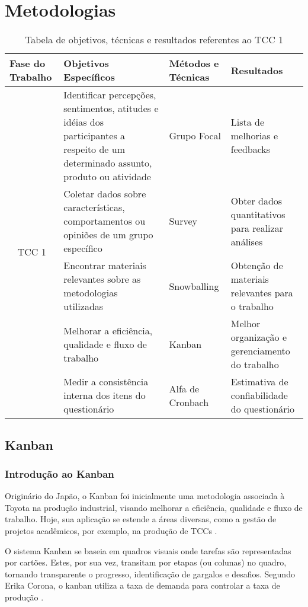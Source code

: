 \chapter[Metodologias]{Metodologias}

\begin{table}[!ht]
    \centering
    \begin{tabularx}{\textwidth}{|X|X|X|X|}
    \hline
        Fase do Trabalho & Objetivos Específicos & Métodos e Técnicas & Resultados \\ \hline
        \multicolumn{1}{c|}{\multirow{12}{*}{TCC 1}} & Identificar percepções, sentimentos, atitudes
        e idéias dos participantes a respeito de um determinado assunto, produto ou atividade & Grupo Focal & Lista de melhorias e feedbacks \\ \cline{2-4}
        & Coletar dados sobre características, comportamentos ou opiniões de um grupo específico & Survey & Obter dados quantitativos para realizar análises \\ \cline{2-4}
        & Encontrar materiais relevantes sobre as metodologias utilizadas & Snowballing & Obtenção de materiais relevantes para o trabalho \\ \cline{2-4}
        & Melhorar a eficiência, qualidade e fluxo de trabalho & Kanban & Melhor organização e gerenciamento do trabalho \\ \cline{2-4}
        & Medir a consistência interna dos itens do questionário & Alfa de Cronbach & Estimativa de confiabilidade do questionário \\ \hline
    \end{tabularx}
    \caption{Tabela de objetivos, técnicas e resultados referentes ao TCC 1}
\end{table}

\section{Kanban}
\subsection{Introdução ao Kanban}
Originário do Japão, o Kanban foi inicialmente uma metodologia associada à Toyota na produção industrial, visando melhorar a eficiência, qualidade e fluxo de trabalho. Hoje, sua aplicação se estende a áreas diversas, como a gestão de projetos acadêmicos, por exemplo, na produção de TCCs \cite{corona2013review}.

O sistema Kanban se baseia em quadros visuais onde tarefas são representadas por cartões. Estes, por sua vez, transitam por etapas (ou colunas) no quadro, tornando transparente o progresso, identificação de gargalos e desafios. Segundo Erika Corona, o kanban utiliza a taxa de demanda para controlar a taxa de produção \cite{corona2013review}.

